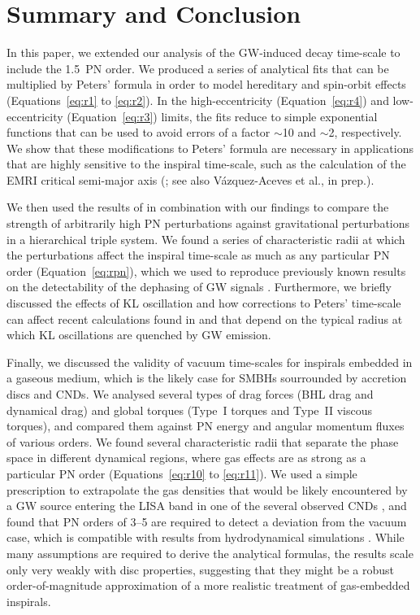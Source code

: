 \documentclass[usenatbib]{mnras}
\begin{document}
\section{Summary and Conclusion}\label{sec:conclusions}

In this paper, we extended our analysis of the GW-induced decay time-scale to include the 1.5~PN order. We produced a series of analytical fits that can be multiplied by Peters' formula in order to model hereditary and spin-orbit effects (Equations~\ref{eq:r1} to \ref{eq:r2}). In the high-eccentricity (Equation~\ref{eq:r4}) and low-eccentricity (Equation~\ref{eq:r3}) limits, the fits reduce to simple exponential functions that can be used to avoid errors of a factor $\sim$10 and $\sim$2, respectively. We show that these modifications to Peters' formula are necessary in applications that are highly sensitive to the inspiral time-scale, such as the calculation of the EMRI critical semi-major axis (\citealt{pau_2013,Amaro_Seoane_2019}; see also V\'{a}zquez-Aceves et al., in prep.).

We then used the results of \cite{Will_KL} in combination with our findings to compare the strength of arbitrarily high PN perturbations against gravitational perturbations in a hierarchical triple system. We found a series of characteristic radii at which the perturbations affect the inspiral time-scale as much as any particular PN order (Equation~\ref{eq:rpn}), which we used to reproduce previously known results on the detectability of the dephasing of GW signals \citep{PhysRevD.83.044030}. Furthermore, we briefly discussed the effects of KL oscillation and how corrections to Peters' time-scale can affect recent calculations found in \cite{2019arXiv190208604R} and \cite{2020ApJ...901..125D} that depend on the typical radius at which KL oscillations are quenched by GW emission.

Finally, we discussed the validity of vacuum time-scales for inspirals embedded in a gaseous medium, which is the likely case for SMBHs sourrounded by accretion discs and CNDs. We analysed several types of drag forces (BHL drag and dynamical drag) and global torques (Type~I torques and Type~II viscous torques), and compared them against PN energy and angular momentum fluxes of various orders. We found several characteristic radii that separate the phase space in different dynamical regions, where gas effects are as strong as a particular PN order (Equations~\ref{eq:r10} to \ref{eq:r11}). We used a simple prescription to extrapolate the gas densities that would be likely encountered by a GW source entering the LISA band in one of the several observed CNDs \citep[][]{2014ApJ...784...70M}, and found that PN orders of 3--5 are required to detect a deviation from the vacuum case, which is compatible with results from hydrodynamical simulations \citep{2019MNRAS.486.2754D,2020arXiv200511333D}. While many assumptions are required to derive the analytical formulas, the results scale only very weakly with disc properties, suggesting that they might be a robust order-of-magnitude approximation of a more realistic treatment of gas-embedded inspirals.
\end{document}
